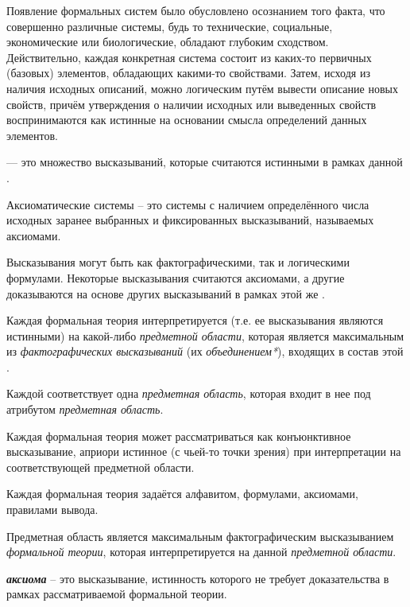 Появление формальных систем было обусловлено осознанием того факта, что совершенно различные системы, будь то технические, социальные, экономические или биологические, обладают глубоким сходством. Действительно, каждая конкретная система состоит из каких-то первичных (базовых) элементов, обладающих какими-то свойствами. Затем, исходя из наличия исходных описаний, можно логическим путём вывести описание новых свойств, причём утверждения о наличии исходных или выведенных свойств воспринимаются как истинные на основании смысла определений данных элементов.

 — это множество высказываний, которые считаются истинными в рамках данной .

Аксиоматические системы -- это системы с наличием определённого числа исходных заранее выбранных и фиксированных высказываний, называемых аксиомами.

Высказывания могут быть как фактографическими, так и логическими формулами. Некоторые высказывания считаются аксиомами, а другие доказываются на основе других высказываний в рамках этой же .

Каждая формальная теория интерпретируется (т.е. ее высказывания являются истинными) на какой-либо \textit{предметной области}, которая является максимальным из \textit{фактографических высказываний} (их \textit{объединением*}),  входящих в состав этой .

Каждой  соответствует одна \textit{предметная область}, которая входит в нее под атрибутом \textit{предметная область\scnrolesign}.

Каждая формальная теория может рассматриваться как конъюнктивное высказывание, априори истинное (с чьей-то точки зрения) при интерпретации на соответствующей предметной области.

Каждая формальная теория задаётся алфавитом, формулами, аксиомами, правилами вывода.


Предметная область является максимальным фактографическим высказыванием \textit{формальной теории}, которая интерпретируется на данной \textit{предметной области}.

\textbf{\textit{аксиома}} -- это высказывание, истинность которого не требует доказательства в рамках рассматриваемой формальной теории.

